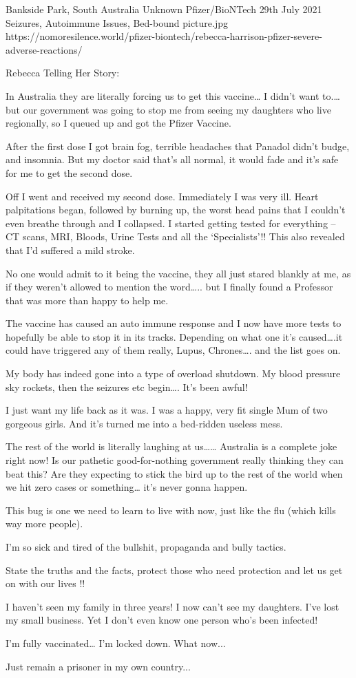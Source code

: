 {Bankside Park, South Australia}
{Unknown}
{Pfizer/BioNTech}
{29th July 2021}
{Seizures, Autoimmune Issues, Bed-bound}
{picture.jpg}
{https://nomoresilence.world/pfizer-biontech/rebecca-harrison-pfizer-severe-adverse-reactions/}
{

Rebecca Telling Her Story:

In Australia they are literally forcing us to get this vaccine… I didn’t want
to.… but our government was going to stop me from seeing my daughters who live
regionally, so I queued up and got the Pfizer Vaccine.

After the first dose I got brain fog, terrible headaches that Panadol didn’t
budge, and insomnia. But my doctor said that’s all normal, it would fade and
it’s safe for me to get the second dose.

Off I went and received my second dose. Immediately I was very ill. Heart
palpitations began, followed by burning up, the worst head pains that I couldn’t
even breathe through and I collapsed. I started getting tested for everything –
CT scans, MRI, Bloods, Urine Tests and all the ‘Specialists’!! This also
revealed that I’d suffered a mild stroke.

No one would admit to it being the vaccine, they all just stared blankly at me,
as if they weren’t allowed to mention the word….. but I finally found a
Professor that was more than happy to help me.

The vaccine has caused an auto immune response and I now have more tests to
hopefully be able to stop it in its tracks. Depending on what one it’s
caused….it could have triggered any of them really, Lupus, Chrones…. and the
list goes on.

My body has indeed gone into a type of overload shutdown. My blood pressure sky
rockets, then the seizures etc begin…. It’s been awful!

I just want my life back as it was. I was a happy, very fit single Mum of two
gorgeous girls. And it’s turned me into a bed-ridden useless mess.

The rest of the world is literally laughing at us…… Australia is a complete joke
right now! Is our pathetic good-for-nothing government really thinking they can
beat this? Are they expecting to stick the bird up to the rest of the world when
we hit zero cases or something… it’s never gonna happen.

This bug is one we need to learn to live with now, just like the flu (which
kills way more people).

I’m so sick and tired of the bullshit, propaganda and bully tactics.

State the truths and the facts, protect those who need protection and let us get
on with our lives !!

I haven’t seen my family in three years! I now can’t see my daughters. I’ve lost
my small business. Yet I don’t even know one person who’s been infected!

I’m fully vaccinated… I’m locked down. What now...

Just remain a prisoner in my own country...

}
